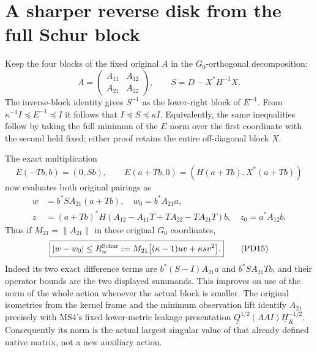 \section{A sharper reverse disk from the full Schur block}
Keep the four blocks of the fixed original $A$ in the $G_0$-orthogonal
decomposition:
\[
 A=\begin{pmatrix}A_{11}&A_{12}\\A_{21}&A_{22}\end{pmatrix},\qquad
 S=D-X^*H^{-1}X.                                                 \tag{PD13}
\]
The inverse-block identity gives $S^{-1}$ as the lower-right block
of $E^{-1}$.  From $\kappa^{-1}I\preceq E^{-1}\preceq I$ it follows
that $I\preceq S\preceq\kappa I$.  Equivalently, the same inequalities
follow by taking the full minimum of the $E$ norm over the first
coordinate with the second held fixed; either proof retains the
entire off-diagonal block $X$.

The exact multiplication
\[
 E(-Tb,b)=(0,Sb),\qquad
 E(a+Tb,0)=(H(a+Tb),X^*(a+Tb))
\]
now evaluates both original pairings as
\[
 \begin{split}
 w&=b^*S A_{21}(a+Tb),\quad w_0=b^*A_{21}a,\\
 z&=(a+Tb)^*H
       (A_{12}-A_{11}T+TA_{22}-TA_{21}T)b,
       \quad z_0=a^*A_{12}b.
 \end{split}                                                      \tag{PD14}
\]
Thus if $M_{21}=\|A_{21}\|$ in these original $G_0$ coordinates,
\[
 \boxed{|w-w_0|\le
 R_w^{\rm Schur}:=M_{21}\bigl[(\kappa-1)uv+\kappa s v^2\bigr].}
                                                                    \tag{PD15}
\]
Indeed its two exact difference terms are
$b^*(S-I)A_{21}a$ and $b^*SA_{21}Tb$, and their operator bounds
are the two displayed summands.  This improves on use of the
norm of the whole action whenever the actual block is smaller.
The original isometries from the kernel frame and the minimum
observation lift identify $A_{21}$ precisely with MS4's fixed
lower-metric leakage presentation
$\underline Q^{1/2}(\Lambda AI)\underline H_K^{-1/2}$.
Consequently its norm is the actual largest singular value of
that already defined native matrix, not a new auxiliary action.

